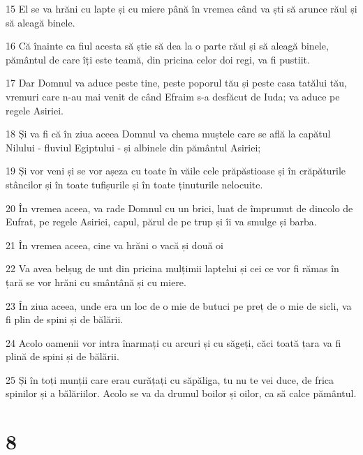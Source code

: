 \par 15 El se va hrăni cu lapte și cu miere până în vremea când va ști să arunce răul și să aleagă binele.
\par 16 Că înainte ca fiul acesta să știe să dea la o parte răul și să aleagă binele, pământul de care îți este teamă, din pricina celor doi regi, va fi pustiit.
\par 17 Dar Domnul va aduce peste tine, peste poporul tău și peste casa tatălui tău, vremuri care n-au mai venit de când Efraim s-a desfăcut de Iuda; va aduce pe regele Asiriei.
\par 18 Și va fi că în ziua aceea Domnul va chema muștele care se află la capătul Nilului - fluviul Egiptului - și albinele din pământul Asiriei;
\par 19 Și vor veni și se vor așeza cu toate în văile cele prăpăstioase și în crăpăturile stâncilor și în toate tufișurile și în toate ținuturile nelocuite.
\par 20 În vremea aceea, va rade Domnul cu un brici, luat de împrumut de dincolo de Eufrat, pe regele Asiriei, capul, părul de pe trup și îi va smulge și barba.
\par 21 În vremea aceea, cine va hrăni o vacă și două oi
\par 22 Va avea belșug de unt din pricina mulțimii laptelui și cei ce vor fi rămas în țară se vor hrăni cu smântână și cu miere.
\par 23 În ziua aceea, unde era un loc de o mie de butuci pe preț de o mie de sicli, va fi plin de spini și de bălării.
\par 24 Acolo oamenii vor intra înarmați cu arcuri și cu săgeți, căci toată țara va fi plină de spini și de bălării.
\par 25 Și în toți munții care erau curățați cu săpăliga, tu nu te vei duce, de frica spinilor și a bălăriilor. Acolo se va da drumul boilor și oilor, ca să calce pământul.

\chapter{8}

